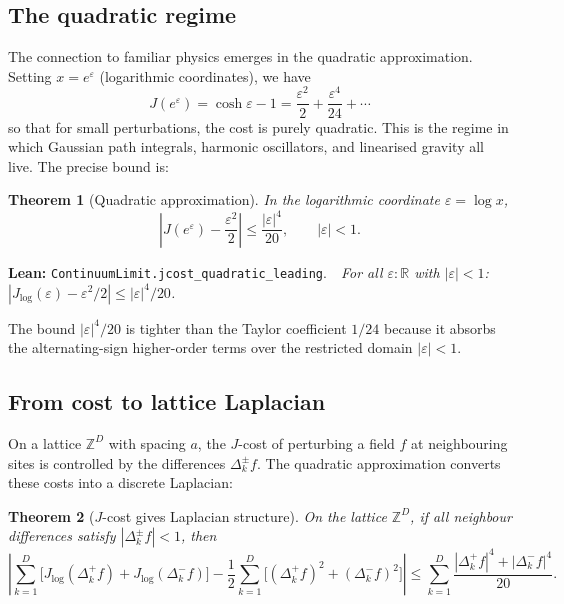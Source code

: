 \documentclass[11pt,a4paper]{article}
\newtheorem{theorem}{Theorem}[section]
\newcommand{\Jcost}{J}
\newcommand{\ZZ}{\mathbb{Z}}
\newcommand{\RR}{\mathbb{R}}
\newcommand{\lean}[1]{\texttt{#1}}
\newcommand{\leanref}[2]{\noindent\textbf{Lean:} \lean{#1}.\ \ \textit{#2}}
\begin{document}
\subsection{The quadratic regime}

The connection to familiar physics emerges in the quadratic approximation.
Setting $x = e^\varepsilon$ (logarithmic coordinates), we have
\[
\Jcost(e^\varepsilon) = \cosh\varepsilon - 1 = \frac{\varepsilon^2}{2} + \frac{\varepsilon^4}{24} + \cdots
\]
so that for small perturbations, the cost is purely quadratic.
This is the regime in which Gaussian path integrals, harmonic oscillators, and linearised gravity all live.
The precise bound is:

\begin{theorem}[Quadratic approximation]
\label{thm:quadratic}
In the logarithmic coordinate $\varepsilon = \log x$,
\begin{equation}\label{eq:quad}
\left|\Jcost(e^\varepsilon) - \frac{\varepsilon^2}{2}\right| \le \frac{|\varepsilon|^4}{20}, \qquad |\varepsilon| < 1.
\end{equation}
\end{theorem}

\leanref{ContinuumLimit.jcost\_quadratic\_leading}{For all $\varepsilon : \RR$ with $|\varepsilon| < 1$: $|J_{\log}(\varepsilon) - \varepsilon^2/2| \le |\varepsilon|^4/20$.}

\noindent The bound $|\varepsilon|^4/20$ is tighter than the Taylor coefficient $1/24$ because it absorbs the alternating-sign higher-order terms over the restricted domain $|\varepsilon| < 1$.

\subsection{From cost to lattice Laplacian}

On a lattice $\ZZ^D$ with spacing $a$, the $\Jcost$-cost of perturbing a field $f$ at neighbouring sites is controlled by the differences $\Delta_k^\pm f$.
The quadratic approximation converts these costs into a discrete Laplacian:

\begin{theorem}[$\Jcost$-cost gives Laplacian structure]
\label{thm:laplacian}
On the lattice $\ZZ^D$, if all neighbour differences satisfy $|\Delta_k^\pm f| < 1$, then
\begin{equation}\label{eq:laplacian_bridge}
\left|\sum_{k=1}^{D}\bigl[\Jcost_{\log}(\Delta_k^+f) + \Jcost_{\log}(\Delta_k^-f)\bigr] - \frac{1}{2}\sum_{k=1}^{D}\bigl[(\Delta_k^+f)^2 + (\Delta_k^-f)^2\bigr]\right| \le \sum_{k=1}^{D}\frac{|\Delta_k^+f|^4 + |\Delta_k^-f|^4}{20}.
\end{equation}
\end{theorem}
\end{document}
